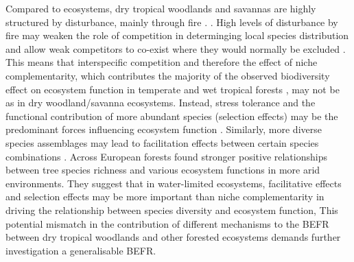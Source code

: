 \documentclass[11pt,a4paper]{article}
\begin{document}
Compared to  ecosystems, dry tropical woodlands and savannas are highly structured by disturbance, mainly through fire  \citep{Sankaran2008, Levick2009}. . High levels of disturbance by fire may weaken the role of competition in determinging local species distribution and allow weak competitors to co-exist where they would normally be excluded \citep{Grime1979, Grace1990}. This means that interspecific competition and therefore the effect of niche complementarity, which contributes the majority of the observed biodiversity effect on ecosystem function in temperate and wet tropical forests \citep{Wright2017, Poorter2015, Sande2017a}, may not be as  in dry woodland/savanna ecosystems. Instead, stress tolerance and the functional contribution of more abundant species (selection effects) may be the predominant forces influencing ecosystem function \citep{Lasky2014, Tobner2016}. Similarly, more diverse species assemblages may lead to facilitation effects between certain species combinations . Across European forests \citet{Ratcliffe2017} found stronger positive relationships between tree species richness and various ecosystem functions in more arid environments. They suggest that in water-limited ecosystems, facilitative effects and selection effects may be more important than niche complementarity in driving the relationship between species diversity and ecosystem function,  This potential mismatch in the contribution of different mechanisms to the BEFR between dry tropical woodlands and other forested ecosystems demands further investigation  a generalisable BEFR.
\end{document}
